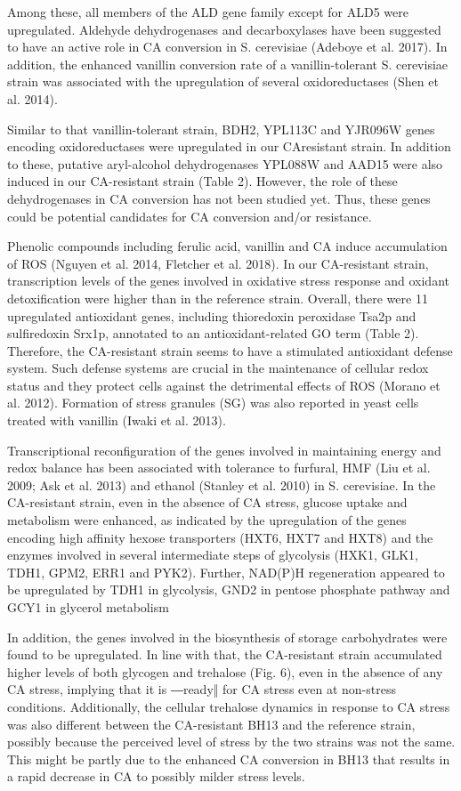 Among these, all members of the ALD gene family except for ALD5 were upregulated. Aldehyde
dehydrogenases and decarboxylases have been suggested to have an active role in CA
conversion in S. cerevisiae (Adeboye et al. 2017). In addition, the enhanced vanillin
conversion rate of a vanillin-tolerant S. cerevisiae strain was associated with the upregulation
of several oxidoreductases (Shen et al. 2014).

Similar to that vanillin-tolerant strain, BDH2,
YPL113C and YJR096W genes encoding oxidoreductases were upregulated in our CAresistant strain. In addition to these, putative aryl-alcohol dehydrogenases YPL088W and
AAD15 were also induced in our CA-resistant strain (Table 2). However, the role of these
dehydrogenases in CA conversion has not been studied yet. Thus, these genes could be
potential candidates for CA conversion and/or resistance.

Phenolic compounds including ferulic acid, vanillin and CA induce accumulation of
ROS (Nguyen et al. 2014, Fletcher et al. 2018). In our CA-resistant strain, transcription levels
of the genes involved in oxidative stress response and oxidant detoxification were higher than
in the reference strain. Overall, there were 11 upregulated antioxidant genes, including thioredoxin peroxidase Tsa2p and sulfiredoxin Srx1p, annotated to an antioxidant-related GO
term (Table 2). Therefore, the CA-resistant strain seems to have a stimulated antioxidant
defense system. Such defense systems are crucial in the maintenance of cellular redox status
and they protect cells against the detrimental effects of ROS (Morano et al. 2012). Formation
of stress granules (SG) was also reported in yeast cells treated with vanillin (Iwaki et al.
2013).

Transcriptional reconfiguration of the genes involved in maintaining energy and redox
balance has been associated with tolerance to furfural, HMF (Liu et al. 2009; Ask et al. 2013)
and ethanol (Stanley et al. 2010) in S. cerevisiae. In the CA-resistant strain, even in the absence of CA stress, glucose uptake and metabolism were enhanced, as indicated by the
upregulation of the genes encoding high affinity hexose transporters (HXT6, HXT7 and HXT8)
and the enzymes involved in several intermediate steps of glycolysis (HXK1, GLK1, TDH1,
GPM2, ERR1 and PYK2). Further, NAD(P)H regeneration appeared to be upregulated by
TDH1 in glycolysis, GND2 in pentose phosphate pathway and GCY1 in glycerol metabolism

In addition, the genes involved in the biosynthesis of storage carbohydrates were found to be
upregulated. In line with that, the CA-resistant strain accumulated higher levels of both
glycogen and trehalose (Fig. 6), even in the absence of any CA stress, implying that it is
―ready‖ for CA stress even at non-stress conditions. Additionally, the cellular trehalose
dynamics in response to CA stress was also different between the CA-resistant BH13 and the
reference strain, possibly because the perceived level of stress by the two strains was not the
same. This might be partly due to the enhanced CA conversion in BH13 that results in a rapid
decrease in CA to possibly milder stress levels.


